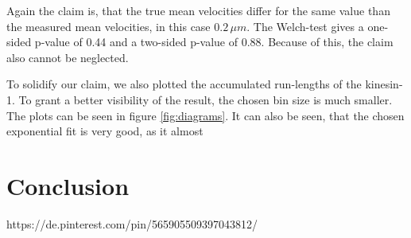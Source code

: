 \documentclass[english, %
parskip=full, %
bibliography=totoc, %
]{scrartcl}
\begin{document}
Again the claim is, that the true mean velocities differ for the same value than the measured mean velocities, in this case \(0.2\, \mu m\). The Welch-test gives a one-sided p-value of 0.44 and a two-sided p-value of 0.88. Because of this, the claim also cannot be neglected. 

To solidify our claim, we also plotted the accumulated run-lengths of the kinesin-1. To grant a better visibility of the result, the chosen bin size is much smaller. The plots can be seen in figure \ref{fig:diagrams}. It can also be seen, that the chosen exponential fit is very good, as it almost 

\section{Conclusion}




\begin{thebibliography}{9}

  https://de.pinterest.com/pin/565905509397043812/

\end{thebibliography}
\end{document}
